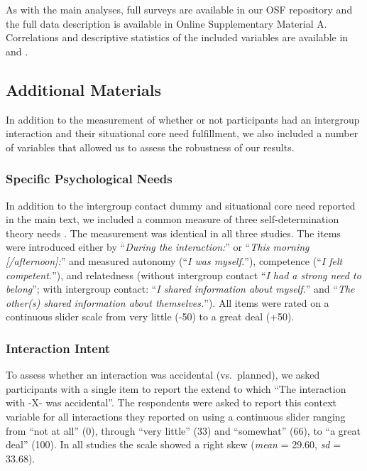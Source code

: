 As with the main analyses, full surveys are available in our OSF
repository \citep{KreienkampMasked2022a} and the full data description
is available in Online Supplementary Material A. Correlations and
descriptive statistics of the included variables are available in
 and .

\subsection{Additional Materials}

In addition to the measurement of whether or not participants had an
intergroup interaction and their situational core need fulfillment, we
also included a number of variables that allowed us to assess the
robustness of our results.

\subsubsection{Specific Psychological Needs}

In addition to the intergroup contact dummy and situational core need
reported in the main text, we included a common measure of three
self-determination theory needs \citep[see][]{Downie2008}. The
measurement was identical in all three studies. The items were
introduced either by ``\textit{During the interaction:}'' or
``\textit{This morning [/afternoon]:}'' and measured autonomy
(``\textit{I was myself.}''), competence
(``\textit{I felt competent.}''), and relatedness (without intergroup
contact ``\textit{I had a strong need to belong}''; with intergroup
contact: ``\textit{I shared information about myself.}'' and
``\textit{The other(s) shared information about themselves.}''). All
items were rated on a continuous slider scale from very little (-50) to
a great deal (+50).

\subsubsection{Interaction Intent}

To assess whether an interaction was accidental (vs.~planned), we asked
participants with a single item to report the extend to which ``The
interaction with -X- was accidental''. The respondents were asked to
report this context variable for all interactions they reported on using
a continuous slider ranging from ``not at all'' (0), through ``very
little'' (33) and ``somewhat'' (66), to ``a great deal'' (100). In all
studies the scale showed a right skew (\textit{mean} = 29.60,
\textit{sd} = 33.68).

